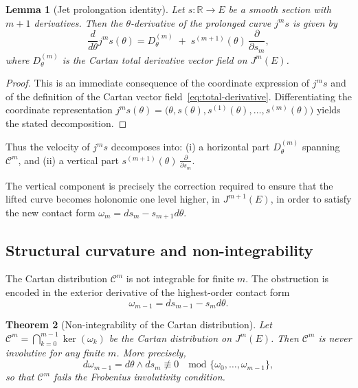 \documentclass[3p,times]{elsarticle}
\newtheorem{theorem}{Theorem}[section]
\newtheorem{lemma}[theorem]{Lemma}
\begin{document}
\begin{lemma}[Jet prolongation identity]
\label{lem:jet-prolong}
Let $s:\mathbb{R}\to E$ be a smooth section with $m+1$ derivatives.  
Then the $\theta$-derivative of the prolonged curve $j^{m}s$ is given by
\begin{equation}
\label{eq:jet-prolong-identity}
\frac{d}{d\theta}j^{m}s(\theta)
=
D^{(m)}_\theta
\;+\;
s^{(m+1)}(\theta)\,\frac{\partial}{\partial s_m},
\end{equation}
where $D^{(m)}_\theta$ is the Cartan total derivative vector field
on $J^{m}(E)$.
\end{lemma}

\begin{proof}
This is an immediate consequence of the coordinate expression of $j^{m}s$ and of the
definition of the Cartan vector field~\eqref{eq:total-derivative}.  
Differentiating the coordinate representation
\(
j^{m}s(\theta)=\big(\theta,s(\theta),s^{(1)}(\theta),\dots,s^{(m)}(\theta)\big)
\)
yields the stated decomposition.
\end{proof}

Thus the velocity of $j^{m}s$ decomposes into:
(i) a horizontal part $D^{(m)}_{\theta}$ spanning $\mathcal{C}^m$, and  
(ii) a vertical part $s^{(m+1)}(\theta)\,\frac{\partial}{\partial s_m}$.

The vertical component is precisely the correction required to ensure that the lifted curve becomes holonomic
one level higher, in $J^{m+1}(E)$, in order to satisfy the new contact form $\omega_m=ds_m - s_{m+1}d\theta$.

\subsection{Structural curvature and non-integrability}

The Cartan distribution $\mathcal{C}^{m}$ is not integrable for finite $m$.  
The obstruction is encoded in the exterior derivative of the highest-order contact form
\[
 \omega_{m-1} = ds_{m-1} - s_m d\theta.
\]
\begin{theorem}[Non-integrability of the Cartan distribution]
\label{thm:non-integrable}
Let $\mathcal{C}^{m}=\bigcap_{k=0}^{m-1}\ker(\omega_k)$ be the Cartan distribution on $J^{m}(E)$.
Then $\mathcal{C}^{m}$ is never involutive for any finite $m$.  
More precisely,
\[
d\omega_{m-1}=d\theta\wedge ds_{m}
\not\equiv 0 
\quad \text{mod }\{\omega_0,\dots,\omega_{m-1}\},
\]
so that $\mathcal{C}^{m}$ fails the Frobenius involutivity condition.
\end{theorem}
\end{document}

